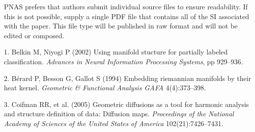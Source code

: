 \documentclass[9pt,twocolumn,twoside,]{pnas-new}
\newenvironment{cslreferences}%
  {}%
  {\par}
\begin{document}
PNAS prefers that authors submit individual source files to ensure
readability. If this is not possible, supply a single PDF file that
contains all of the SI associated with the paper. This file type will be
published in raw format and will not be edited or composed.

\showmatmethods
\showacknow
\pnasbreak

\hypertarget{refs}{}
\begin{cslreferences}
\leavevmode\hypertarget{ref-belkin2002using}{}%
1. Belkin M, Niyogi P (2002) Using manifold stucture for partially
labeled classification. \emph{Advances in Neural Information Processing
Systems}, pp 929--936.

\leavevmode\hypertarget{ref-berard1994embedding}{}%
2. Bérard P, Besson G, Gallot S (1994) Embedding riemannian manifolds by
their heat kernel. \emph{Geometric \& Functional Analysis GAFA}
4(4):373--398.

\leavevmode\hypertarget{ref-coifman2005geometric}{}%
3. Coifman RR, et al. (2005) Geometric diffusions as a tool for harmonic
analysis and structure definition of data: Diffusion maps.
\emph{Proceedings of the National Academy of Sciences of the United
States of America} 102(21):7426--7431.
\end{cslreferences}



% 
\end{document}
